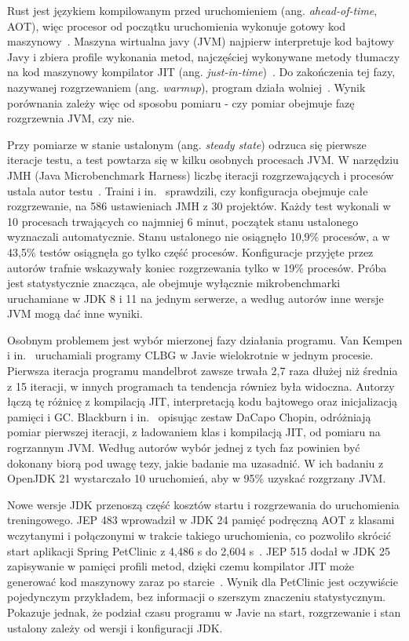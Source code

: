 Rust jest językiem kompilowanym przed uruchomieniem (ang. \textit{ahead-of-time}, AOT), więc procesor od początku uruchomienia wykonuje gotowy kod maszynowy~\cite{klabnik-rustbook}.
Maszyna wirtualna javy (JVM) najpierw interpretuje kod bajtowy Javy i zbiera profile wykonania metod, najczęściej wykonywane metody tłumaczy na kod maszynowy kompilator JIT (ang. \textit{just-in-time})~\cite{jep515}.
Do zakończenia tej fazy, nazywanej rozgrzewaniem (ang. \textit{warmup}), program działa wolniej~\cite{jep515}.
Wynik porównania zależy więc od sposobu pomiaru - czy pomiar obejmuje fazę rozgrzewnia JVM, czy nie.

Przy pomiarze w stanie ustalonym (ang. \textit{steady state}) odrzuca się pierwsze iteracje testu, a test powtarza się w kilku osobnych procesach JVM.
W narzędziu JMH (Java Microbenchmark Harness) liczbę iteracji rozgrzewających i procesów ustala autor testu~\cite{traini2023}.
Traini i in.~\cite{traini2023} sprawdzili, czy konfiguracja obejmuje całe rozgrzewanie, na 586 ustawieniach JMH z 30 projektów.
Każdy test wykonali w 10 procesach trwających co najmniej 6 minut, początek stanu ustalonego wyznaczali automatycznie.
Stanu ustalonego nie osiągnęło 10,9\% procesów, a w 43,5\% testów osiągnęła go tylko część procesów.
Konfiguracje przyjęte przez autorów trafnie wskazywały koniec rozgrzewania tylko w 19\% procesów.
Próba jest statystycznie znacząca, ale obejmuje wyłącznie mikrobenchmarki uruchamiane w JDK 8 i 11 na jednym serwerze, a według autorów inne wersje JVM mogą dać inne wyniki.

Osobnym problemem jest wybór mierzonej fazy działania programu.
Van Kempen i in.~\cite{vankempen2025} uruchamiali programy CLBG w Javie wielokrotnie w jednym procesie.
Pierwsza iteracja programu mandelbrot zawsze trwała 2,7 raza dłużej niż średnia z 15 iteracji, w innych programach ta tendencja równiez była widoczna.
Autorzy łączą tę różnicę z kompilacją JIT, interpretacją kodu bajtowego oraz inicjalizacją pamięci i GC.
Blackburn i in.~\cite{blackburn2025} opisując zestaw DaCapo Chopin, odróżniają pomiar pierwszej iteracji, z ładowaniem klas i kompilacją JIT, od pomiaru na rogrzannym JVM.
Według autorów wybór jednej z tych faz powinien być dokonany biorą pod uwagę tezy, jakie badanie ma uzasadnić.
W ich badaniu z OpenJDK 21 wystarczało 10 uruchomień, aby w 95\% uzyskać rozgrzany JVM.

Nowe wersje JDK przenoszą część kosztów startu i rozgrzewania do uruchomienia treningowego.
JEP 483 wprowadził w JDK 24 pamięć podręczną AOT z klasami wczytanymi i połączonymi w trakcie takiego uruchomienia, co pozwoliło skrócić start aplikacji Spring PetClinic z 4,486 s do 2,604 s~\cite{jep483}.
JEP 515 dodał w JDK 25 zapisywanie w pamięci profili metod, dzięki czemu kompilator JIT może generować kod maszynowy zaraz po starcie~\cite{jep515}.
Wynik dla PetClinic jest oczywiście pojedynczym przykładem, bez informacji o szerszym znaczeniu statystycznym.
Pokazuje jednak, że podział czasu programu w Javie na start, rozgrzewanie i stan ustalony zależy od wersji i konfiguracji JDK.

